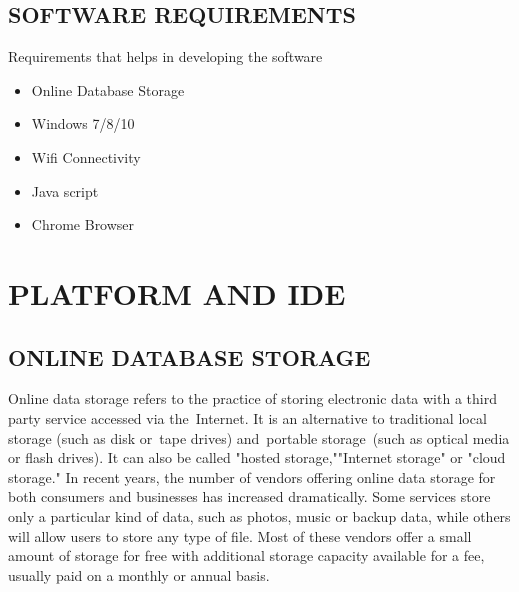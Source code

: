 \documentclass[11pt]{report} %
\begin{document}
\subsection{SOFTWARE REQUIREMENTS}
\label{subsec:SOFTWARE REQUIREMENTS}
Requirements that helps in developing the software
\begin{itemize}
	\item Online Database Storage
	\item Windows 7/8/10
	\item Wifi Connectivity
	\item Java script
	\item Chrome Browser
\end{itemize}
\section{PLATFORM AND IDE}
\label{sec:PLATFORM AND IDE}


\subsection{ONLINE DATABASE STORAGE}
\label{subsec:ONLINE DATABASE STORAGE}
Online data storage refers to the practice of storing electronic data with a third party service accessed via the Internet. It is an alternative to traditional local storage (such as disk or tape drives) and portable storage (such as optical media or flash drives). It can also be called "hosted storage,""Internet storage" or "cloud storage."
In recent years, the number of vendors offering online data storage for both consumers and businesses has increased dramatically. Some services store only a particular kind of data, such as photos, music or backup data, while others will allow users to store any type of file. Most of these vendors offer a small amount of storage for free with additional storage capacity available for a fee, usually paid on a monthly or annual basis.
\end{document}
